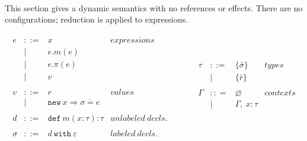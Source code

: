\documentclass{llncs}
\newcommand{\keywadj}[1]{\mathtt{#1}}
\newcommand{\keyw}[1]{\keywadj{#1}~}
\begin{document}
\paragraph{}
This section gives a dynamic semantics with no references or effects. There are no configurations; reduction is applied to expressions.

\[
\begin{array}{lll}
\begin{array}{lllr}
	e & ::= & x & expressions \\
  		& | & e.m(e)\\
  		& | & e.\pi(e)\\
		& | & v \\
		&&\\
		
	v & ::= & r & values \\
  		& | & \keywadj{new}~x \Rightarrow \overline{\sigma = e} \\
		&&\\

	d & ::= & \keyw{def} m(x:\tau):\tau & unlabeled~decls.\\		&&\\
		
	\sigma & ::= & d~\keyw{with}\varepsilon  & labeled~ decls.\\
		&&\\
\end{array}
& ~~~~~~
&

\begin{array}{lllr}

	\tau & ::= & \{ \bar \sigma \}  & types \\
		& | & \{ \bar r \} \\
		&&\\

	\Gamma & :: = & \varnothing & contexts\\
		& | & \Gamma,~x : \tau\\
		&&\\

&&\\

\end{array}
\end{array}
\]
\end{document}
